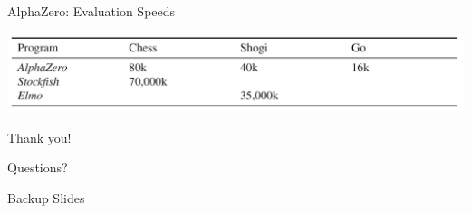 \documentclass{beamer}
\begin{document}
{    \begin{frame}{AlphaZero: Evaluation Speeds}
      \begin{center}
        \includegraphics[width=\textwidth]{../img/AlphaZero-paper/evaluation-speed-of-AlphaZero.png}
      \end{center}
    \end{frame}
  }

  \begin{frame}[standout]
    \begin{center}
      Thank you!

      Questions?
    \end{center}
  \end{frame}

  \begin{frame}[standout]
    Backup Slides
  \end{frame}
\end{document}
